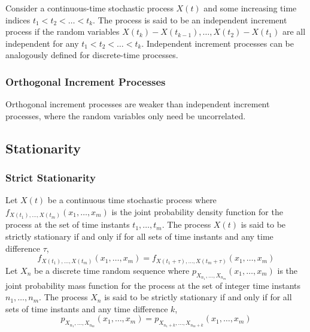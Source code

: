 \documentclass[11pt]{report} %
\begin{document}
Consider a continuous-time stochastic process $X\left(t\right)$ and some increasing time indices $t_{1} < t_{2} < \dots < t_{k}$. The process is said to be an independent increment process if the random variables $X\left(t_{k}\right) - X\left(t_{k - 1}\right), \dots, X\left(t_{2}\right) - X\left(t_{1}\right)$ are all independent for any $t_{1} < t_{2} < \dots < t_{k}$. Independent increment processes can be analogously defined for discrete-time processes.

\subsubsection{Orthogonal Increment Processes}

Orthogonal increment processes are weaker than independent increment processes, where the random variables only need be uncorrelated.

\subsection{Stationarity}

\subsubsection{Strict Stationarity}

Let $X\left(t\right)$ be a continuous time stochastic process where $f_{X\left(t_{1}\right), \dots, X\left(t_{m}\right)}\left(x_{1}, \dots, x_{m}\right)$ is the joint probability density function for the process at the set of time instants $t_{1}, \dots, t_{m}$. The process $X\left(t\right)$ is said to be strictly stationary if and only if for all sets of time instants and any time difference $\tau$,
\begin{equation}
f_{X\left(t_{1}\right), \dots, X\left(t_{m}\right)}\left(x_{1}, \dots, x_{m}\right) = f_{X\left(t_{1} + \tau\right), \dots, X\left(t_{m} + \tau\right)}\left(x_{1}, \dots, x_{m}\right)
\end{equation}
Let $X_{n}$ be a discrete time random sequence where $p_{X_{n_{1}}, \dots, X_{n_{m}}}\left(x_{1}, \dots, x_{m}\right)$ is the joint probability mass function for the process at the set of integer time instants $n_{1}, \dots, n_{m}$. The process $X_{n}$ is said to be strictly stationary if and only if for all sets of time instants and any time difference $k$,
\begin{equation}
p_{X_{n_{1}}, \dots, X_{n_{m}}}\left(x_{1}, \dots, x_{m}\right) = p_{X_{n_{1} + k}, \dots, X_{n_{m} + k}}\left(x_{1}, \dots, x_{m}\right)
\end{equation}
\end{document}
